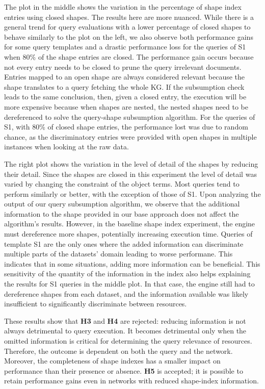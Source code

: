 The plot in the middle shows the variation in the percentage of shape index entries using closed shapes.
The results here are more nuanced.
While there is a general trend for query evaluations with a lower percentage of closed shapes to behave similarly to the plot on the left, we also observe both performance gains for some query templates and a drastic performance loss for the queries of S1 when 80\% of the shape entries are closed.
The performance gain occurs because not every entry needs to be closed to prune the query irrelevant documents.
Entries mapped to an open shape are always considered relevant because the shape translates to a query fetching the whole KG.
If the subsumption check leads to the same conclusion, then, given a closed entry, the execution will be more expensive because 
when shapes are nested, the nested shapes need to be dereferenced to solve the query-shape subsumption algorithm.
For the queries of S1, with 80\% of closed shape entries, the performance lost was due to random chance, as the discriminatory entries were provided with open shapes in multiple instances when looking at the raw data.

The right plot shows the variation in the level of detail of the shapes by reducing their detail.
Since the shapes are closed in this experiment the level of detail was varied by changing the constraint of the object terms.
Most queries tend to perform similarly or better, with the exception of those of S1.
Upon analyzing the output of our query subsumption algorithm, we observe that the additional information to the shape provided in our base approach does not affect the algorithm's results.
However, in the baseline shape index experiment, the engine must dereference more shapes, potentially increasing execution time.
Queries of template S1 are the only ones where the added information can discriminate multiple parts of the datasets' domain leading to worse performane.
This indicates that in some situations, adding more information can be beneficial.
This sensitivity of the quantity of the information in the index also helps explaining the results for S1 queries in the middle plot. 
In that case, the engine still had to dereference shapes from each dataset, and the information available was likely insufficient to significantly discriminate between resources.

These results show that \textbf{H3} and \textbf{H4} are rejected: reducing information is not always detrimental to query execution.
It becomes detrimental only when the omitted information is critical for determining the query relevance of resources. 
Therefore, the outcome is dependent on both the query and the network. 
Moreover, the completeness of shape indexes has a smaller impact on performance than their presence or absence.
\textbf{H5} is accepted; it is possible to retain performance gains even in networks with reduced shape-index information.

